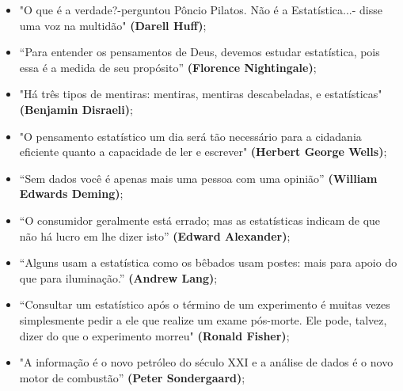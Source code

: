 \begin{itemize}
 \item "O que é a verdade?-perguntou Pôncio Pilatos. Não é a Estatística...- disse uma voz na multidão" \textbf{(Darell Huff)};
 \item “Para entender os pensamentos de Deus, devemos estudar estatística, pois essa é a medida de seu propósito” \textbf{(Florence Nightingale)};
  \item "Há três tipos de mentiras: mentiras, mentiras descabeladas, e estatísticas" \textbf{(Benjamin Disraeli)};
\item "O pensamento estatístico um dia será tão necessário para a cidadania eficiente quanto a capacidade de ler e escrever" \textbf{(Herbert George Wells)};
\item “Sem dados você é apenas mais uma pessoa com uma opinião” \textbf{(William Edwards Deming)};
\item “O consumidor geralmente está errado; mas as estatísticas indicam de que não há lucro em lhe dizer isto” \textbf{(Edward Alexander)};
\item “Alguns usam a estatística como os bêbados usam postes: mais para apoio do que para iluminação.” \textbf{(Andrew Lang)};
\item “Consultar um estatístico após o término de um experimento é muitas vezes simplesmente pedir a ele que realize um exame pós-morte. Ele pode, talvez, dizer do que o experimento morreu" \textbf{(Ronald Fisher)};
\item "A informação é o novo petróleo do século XXI e a análise de dados é o novo motor de combustão” \textbf{(Peter Sondergaard)};

\end{itemize}



